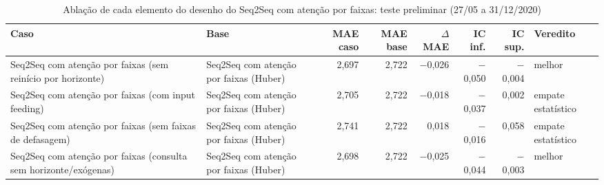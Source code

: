 \begin{table}[!htbp]
    \centering
    \caption{Ablação de cada elemento do desenho do Seq2Seq com atenção por faixas: teste preliminar (27/05 a 31/12/2020)}
    \label{tab:ablacao_desenho_teste_historico}
    \small
    \begin{adjustbox}{max width=\textwidth}
    \begin{tabular}{>{\raggedright\arraybackslash}p{}lrrrrrl}
        \toprule
        Caso & Base & MAE caso & MAE base & $\Delta$ MAE & IC inf. & IC sup. & Veredito \\
        \midrule
        Seq2Seq com atenção por faixas (sem reinício por horizonte) & Seq2Seq com atenção por faixas (Huber) & 2,697 & 2,722 & $-$0,026 & $-$0,050 & $-$0,004 & melhor \\
        Seq2Seq com atenção por faixas (com input feeding) & Seq2Seq com atenção por faixas (Huber) & 2,705 & 2,722 & $-$0,018 & $-$0,037 & 0,002 & empate estatístico \\
        Seq2Seq com atenção por faixas (sem faixas de defasagem) & Seq2Seq com atenção por faixas (Huber) & 2,741 & 2,722 & 0,018 & $-$0,016 & 0,058 & empate estatístico \\
        Seq2Seq com atenção por faixas (consulta sem horizonte/exógenas) & Seq2Seq com atenção por faixas (Huber) & 2,698 & 2,722 & $-$0,025 & $-$0,044 & $-$0,003 & melhor \\
        \bottomrule
    \end{tabular}
    \end{adjustbox}
\end{table}
